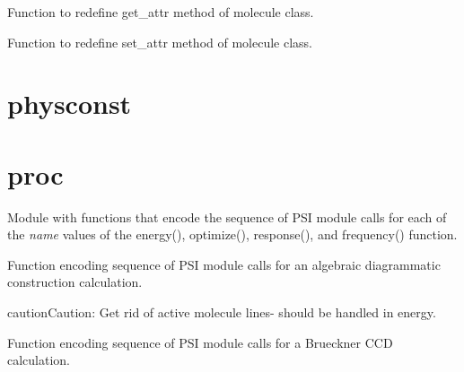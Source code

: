\documentclass[letterpaper,10pt,english]{sphinxmanual}
\begin{document}

\begin{fulllineitems}
\label{index:molutil.new_get_attr}
Function to redefine get\_attr method of molecule class.

\end{fulllineitems}


\begin{fulllineitems}
\label{index:molutil.new_set_attr}
Function to redefine set\_attr method of molecule class.

\end{fulllineitems}



\section{physconst}
\label{index:physconst}\label{index:module-physconst}

\section{proc}
\label{index:proc}\label{index:module-proc}
Module with functions that encode the sequence of PSI module
calls for each of the \emph{name} values of the energy(), optimize(),
response(), and frequency() function.

\begin{fulllineitems}
\label{index:proc.run_adc}
Function encoding sequence of PSI module calls for
an algebraic diagrammatic construction calculation.

\begin{notice}{caution}{Caution:}
Get rid of active molecule lines- should be handled in energy.
\end{notice}

\end{fulllineitems}


\begin{fulllineitems}
\label{index:proc.run_bccd}
Function encoding sequence of PSI module calls for
a Brueckner CCD calculation.

\end{fulllineitems}
\end{document}
